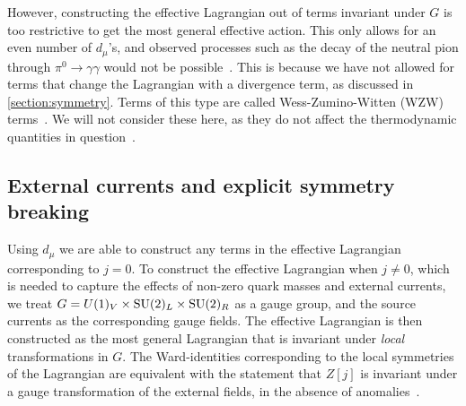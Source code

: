 However, constructing the effective Lagrangian out of terms invariant under $G$ is too restrictive to get the most general effective action.
This only allows for an even number of $d_\mu$'s, and observed processes such as the decay of the neutral pion through $\pi^0 \rightarrow \gamma \gamma$ would not be possible~\cite{Scherer2002IntroductionTC}.
This is because we have not allowed for terms that change the Lagrangian with a divergence term, as discussed in \autoref{section:symmetry}.
Terms of this type are called Wess-Zumino-Witten (WZW) terms~\cite{weinberg_1996_vol2}.
We will not consider these here, as they do not affect the thermodynamic quantities in question~\cite{Andersen:two-flavor-chpt}.

\subsection*{External currents and explicit symmetry breaking}
\label{Covarinat derivative}

Using $d_\mu$ we are able to construct any terms in the effective Lagrangian corresponding to $j=0$.
To construct the effective Lagrangian when $j \neq 0$, which is needed to capture the effects of non-zero quark masses and external currents, we treat $G =  U(1)_V \times \mathrm{SU}(2)_L\times \mathrm{SU}(2)_R$ as a gauge group, and the source currents as the corresponding gauge fields.
The effective Lagrangian is then constructed as the most general Lagrangian that is invariant under \emph{local} transformations in $G$.
The Ward-identities corresponding to the local symmetries of the Lagrangian are equivalent with the statement that $Z[j]$ is invariant under a gauge transformation of the external fields, in the absence of anomalies~\cite{Leutwyler:on_the_fundations}.

